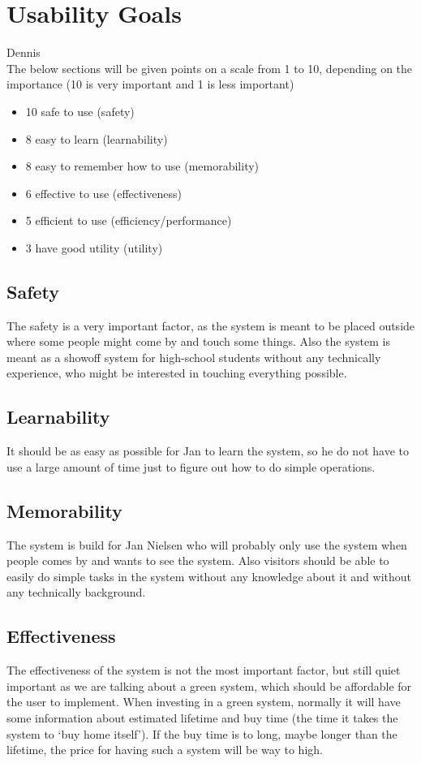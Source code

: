 \section{Usability Goals}Dennis\\
The below sections will be given points on a scale from 1 to 10, depending on
the importance (10 is very important and 1 is less important)
\begin{itemize}
	\item 10 safe to use (safety)
	\item 8 easy to learn (learnability) 
	\item 8 easy to remember how to use (memorability)
	\item 6 effective to use (effectiveness) 
	\item 5 efficient to use (efficiency/performance)
	\item 3 have good utility (utility)	
\end{itemize}
\subsection{Safety}
The safety is a very important factor, as the system is meant to be placed
outside where some people might come by and touch some things. Also the
system is meant as a showoff system for high-school students without any 
technically experience, who might be interested in touching everything possible.
\subsection{Learnability}
It should be as easy as possible for Jan to learn the system, so he do not have
to use a large amount of time just to figure out how to do simple operations.
\subsection{Memorability}
The system is build for Jan Nielsen who will probably only use the system when
people comes by and wants to see the system. Also visitors should be able to
easily do simple tasks in the system without any knowledge about it and without
any technically background.
\subsection{Effectiveness}
The effectiveness of the system is not the most important factor, but
still quiet important as we are talking about a green system, which should be
affordable for the user to implement. When investing in a green system, normally
it will have some information about estimated lifetime and buy time (the time
it takes the system to `buy home itself'). If the buy time is to long, maybe
longer than the lifetime, the price for having such a system will be way to
high.
